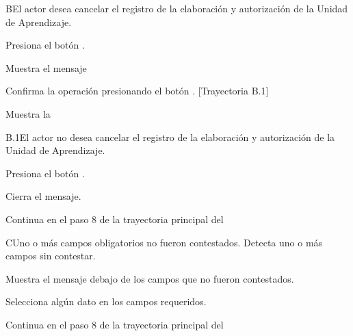 
\begin{UCtrayectoriaA}{B}{El actor desea cancelar el registro de la elaboración y autorización de la Unidad de Aprendizaje.}

\UCpaso[\UCactor] Presiona el botón .

\UCpaso Muestra el mensaje 

\UCpaso[\UCactor] Confirma la operación presionando el botón . [Trayectoria B.1]

\UCpaso Muestra la 

\end{UCtrayectoriaA}


\begin{UCtrayectoriaA}{B.1}{El actor no desea cancelar el registro de la elaboración y autorización de la Unidad de Aprendizaje.}

\UCpaso[\UCactor] Presiona el botón .

\UCpaso Cierra el mensaje.

\UCpaso Continua en el paso 8 de la trayectoria principal del 

\end{UCtrayectoriaA}


\begin{UCtrayectoriaA}{C}{Uno o más campos obligatorios no fueron contestados.}
    \UCpaso Detecta uno o más campos sin contestar.

    \UCpaso Muestra el mensaje  debajo de los campos que no fueron contestados.

    \UCpaso[\UCactor] Selecciona algún dato en los campos requeridos.

    \UCpaso Continua en el paso 8 de la trayectoria principal del 
\end{UCtrayectoriaA}
